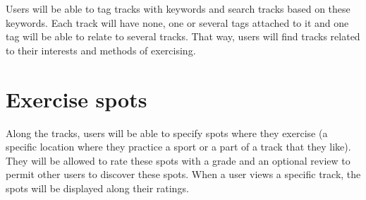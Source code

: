 \documentclass[a4paper]{article}
\begin{document}
Users will be able to tag tracks with keywords and search tracks based on these keywords. Each track will have none, one or several tags attached to it and one tag will be able to relate to several tracks. That way, users will find tracks related to their interests and methods of exercising.

\section{Exercise spots}

Along the tracks, users will be able to specify spots where they exercise (a specific location where they practice a sport or a part of a track that they like). They will be allowed to rate these spots with a grade and an optional review to permit other users to discover these spots.
When a user views a specific track, the spots will be displayed along their ratings.
\end{document}
